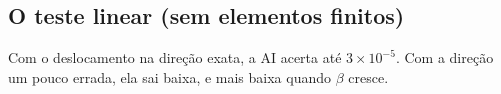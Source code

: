 \documentclass[11pt,a4paper]{article}
\begin{document}
\subsection{O teste linear (sem elementos finitos)}
\begin{table}[H]\centering\small
{}
\caption{Falha $\bm\alpha\cdot\bm\xi > \beta$, com $P_f$ exata. Erro relativo, com o erro em desvios entre parênteses.}
\end{table}
Com o deslocamento na direção exata, a AI acerta até $3\times10^{-5}$. Com a direção um pouco errada, ela sai baixa, e
mais baixa quando $\beta$ cresce.
\end{document}
